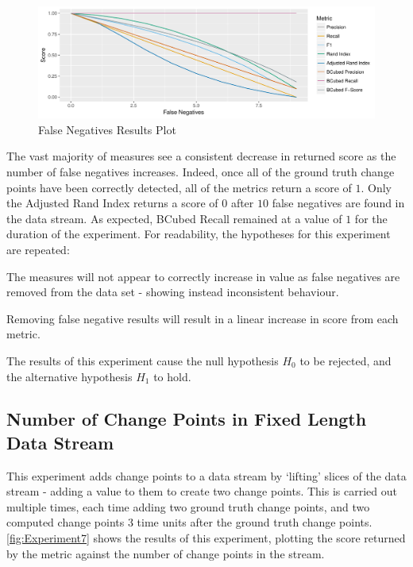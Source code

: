 \documentclass[../main.tex]{subfiles}
\begin{document}
\begin{figure}[h]
    \includegraphics[width=\textwidth]{figures/Experiment6}
    \caption{False Negatives Results Plot}
    \label{fig:Experiment6}
\end{figure}

The vast majority of measures see a consistent decrease in returned score as the number of false negatives increases. Indeed, once all of the ground truth change points have been correctly detected, all of the metrics return a score of $1$. Only the Adjusted Rand Index returns a score of $0$ after $10$ false negatives are found in the data stream. As expected, BCubed Recall remained at a value of $1$ for the duration of the experiment. For readability, the hypotheses for this experiment are repeated:

\begin{hypothesis*}
    The measures will not appear to correctly increase in value as false negatives are removed from the data set - showing instead inconsistent behaviour.
\end{hypothesis*}

\begin{nullhypothesis*}
    Removing false negative results will result in a linear increase in score from each metric.
\end{nullhypothesis*}

The results of this experiment cause the null hypothesis $H_0$ to be rejected, and the alternative hypothesis $H_1$ to hold.

\subsection{Number of Change Points in Fixed Length Data Stream}

This experiment adds change points to a data stream by `lifting' slices of the data stream - adding a value to them to create two change points. This is carried out multiple times, each time adding two ground truth change points, and two computed change points 3 time units after the ground truth change points. \autoref{fig:Experiment7} shows the results of this experiment, plotting the score returned by the metric against the number of change points in the stream.
\end{document}
